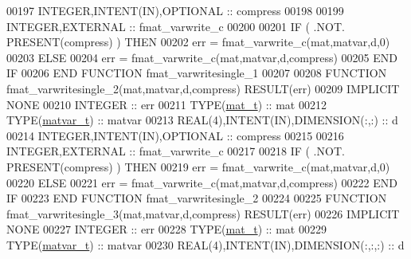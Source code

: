 \begin{DoxyCode}
00197     \textcolor{keywordtype}{INTEGER},\textcolor{keywordtype}{INTENT(IN)},\textcolor{keywordtype}{OPTIONAL}              :: compress
00198 
00199     \textcolor{keywordtype}{INTEGER},\textcolor{keywordtype}{EXTERNAL}                         :: fmat\_varwrite\_c
00200 
00201     \textcolor{keywordflow}{IF} ( .NOT. \textcolor{keyword}{PRESENT}(compress) ) \textcolor{keywordflow}{THEN}
00202         err = fmat\_varwrite\_c(mat,matvar,d,0)
00203     \textcolor{keywordflow}{ELSE}
00204         err = fmat\_varwrite\_c(mat,matvar,d,compress)
00205 \textcolor{keywordflow}{    END IF}
00206 \textcolor{keyword}{END FUNCTION }fmat\_varwritesingle\_1
00207 
00208 \textcolor{keyword}{FUNCTION }fmat\_varwritesingle\_2(mat,matvar,d,compress) \textcolor{keyword}{RESULT}(err)
00209 \textcolor{keywordtype}{IMPLICIT NONE}
00210     \textcolor{keywordtype}{INTEGER}                                  :: err
00211     \textcolor{keywordtype}{TYPE}(\hyperlink{group___m_a_t_gab0fc888f5a5d79943b16284b1f91c2e8}{mat\_t})                              :: mat
00212     \textcolor{keywordtype}{TYPE}(\hyperlink{group___m_a_t_structmatvar__t}{matvar\_t})                           :: matvar
00213     \textcolor{keywordtype}{REAL(4)},\textcolor{keywordtype}{INTENT(IN)},\textcolor{keywordtype}{DIMENSION(:,:)}        :: d
00214     \textcolor{keywordtype}{INTEGER},\textcolor{keywordtype}{INTENT(IN)},\textcolor{keywordtype}{OPTIONAL}              :: compress
00215 
00216     \textcolor{keywordtype}{INTEGER},\textcolor{keywordtype}{EXTERNAL}                         :: fmat\_varwrite\_c
00217 
00218     \textcolor{keywordflow}{IF} ( .NOT. \textcolor{keyword}{PRESENT}(compress) ) \textcolor{keywordflow}{THEN}
00219         err = fmat\_varwrite\_c(mat,matvar,d,0)
00220     \textcolor{keywordflow}{ELSE}
00221         err = fmat\_varwrite\_c(mat,matvar,d,compress)
00222 \textcolor{keywordflow}{    END IF}
00223 \textcolor{keyword}{END FUNCTION }fmat\_varwritesingle\_2
00224 
00225 \textcolor{keyword}{FUNCTION }fmat\_varwritesingle\_3(mat,matvar,d,compress) \textcolor{keyword}{RESULT}(err)
00226 \textcolor{keywordtype}{IMPLICIT NONE}
00227     \textcolor{keywordtype}{INTEGER}                                  :: err
00228     \textcolor{keywordtype}{TYPE}(\hyperlink{group___m_a_t_gab0fc888f5a5d79943b16284b1f91c2e8}{mat\_t})                              :: mat
00229     \textcolor{keywordtype}{TYPE}(\hyperlink{group___m_a_t_structmatvar__t}{matvar\_t})                           :: matvar
00230     \textcolor{keywordtype}{REAL(4)},\textcolor{keywordtype}{INTENT(IN)},\textcolor{keywordtype}{DIMENSION(:,:,:)}      :: d

\end{DoxyCode}
